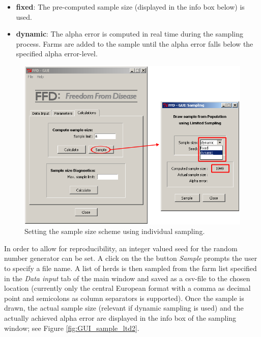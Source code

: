 \documentclass[nojss]{jss}
\begin{document}
\begin{itemize} \item \textbf{fixed}: The pre-computed sample size (displayed in the info box below) is used. \item \textbf{dynamic}: The alpha error is computed in real time during the sampling process. Farms are added to the sample until the alpha error falls below the specified alpha error-level. \end{itemize}

\begin{figure}[h!t]
\begin{center}
\includegraphics[width=120mm]{GUI_sample_ltd1.png}
\end{center}
\caption{Setting the sample size scheme using individual sampling.} \label{fig:GUI_sample_ltd1}
\end{figure}

In order to allow for reproducibility, an integer valued seed for the random number generator can be set. A click on the the button \emph{Sample} prompts the user to specify a file name. A list of herds is then sampled from the farm list specified in the \emph{Data input} tab of the main window and saved as a csv-file to the chosen location (currently only the central European format with a comma as decimal point and semicolons as column separators is supported). Once the sample is drawn, the actual sample size (relevant if dynamic sampling is used) and the actually achieved alpha error are displayed in the info box of the sampling window; see Figure \ref{fig:GUI_sample_ltd2}.
\end{document}
